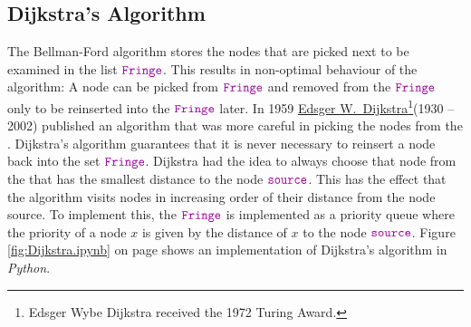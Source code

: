 \subsection{Dijkstra's Algorithm \label{sec:dijkstra}}
The Bellman-Ford algorithm stores the nodes that are picked next to be examined in the list $\mytt{Fringe}$.
This results in non-optimal behaviour of the algorithm:  A node can be picked from $\mytt{Fringe}$ and
removed from the $\mytt{Fringe}$ only to be reinserted into the $\mytt{Fringe}$ later.  In 1959
\href{https://en.wikipedia.org/wiki/Edsger_W._Dijkstra}{Edsger W.~Dijkstra}\footnote{
  Edsger Wybe Dijkstra received the 1972 Turing Award.}(1930 -- 2002) \cite{dijkstra:59}
published an algorithm that was more careful in picking the nodes from the .  Dijkstra's algorithm guarantees that it
is never necessary to reinsert a node back into the set $\mytt{Fringe}$.  Dijkstra had the idea to always choose
that node from the  that has the smallest distance to the node $\mytt{source}$.  This has the effect that the algorithm
visits nodes in increasing order of their distance from the node source.  
To implement this,  the $\mytt{Fringe}$ is implemented as a priority queue where the priority of a node $x$ is
given by the distance of $x$ to the node $\mytt{source}$.  Figure \ref{fig:Dijkstra.ipynb} on page
\pageref{fig:Dijkstra.ipynb} shows an implementation of Dijkstra's algorithm 
in \textsl{Python}.


